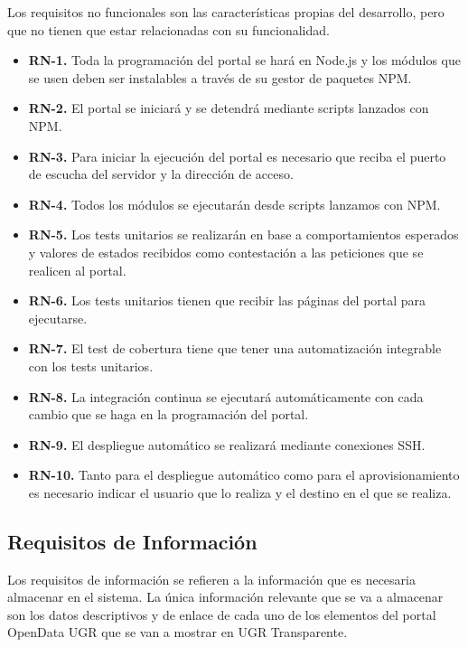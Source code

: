 Los requisitos no funcionales son las características propias del desarrollo, pero que no tienen que estar relacionadas con su 
funcionalidad.

\begin{itemize}
  \item \textbf{RN-1.} Toda la programación del portal se hará en Node.js y los módulos que se usen deben ser instalables a 
  través de su gestor de paquetes NPM.
  \item \textbf{RN-2.} El portal se iniciará y se detendrá mediante scripts lanzados con NPM.
  \item \textbf{RN-3.} Para iniciar la ejecución del portal es necesario que reciba el puerto de escucha del servidor y la 
  dirección de acceso.
  \item \textbf{RN-4.} Todos los módulos se ejecutarán desde scripts lanzamos con NPM.
  \item \textbf{RN-5.} Los tests unitarios se realizarán en base a comportamientos esperados y valores de estados
  recibidos como contestación a las peticiones que se realicen al portal.
  \item \textbf{RN-6.} Los tests unitarios tienen que recibir las páginas del portal para ejecutarse.
  \item \textbf{RN-7.} El test de cobertura tiene que tener una automatización integrable con los tests unitarios. 
  \item \textbf{RN-8.} La integración continua se ejecutará automáticamente con cada cambio que se haga en la programación
  del portal.
  \item \textbf{RN-9.} El despliegue automático se realizará mediante conexiones SSH.
  \item \textbf{RN-10.} Tanto para el despliegue automático como para el aprovisionamiento es necesario indicar el usuario que
  lo realiza y el destino en el que se realiza.
\end{itemize}

\subsection{Requisitos de Información}

Los requisitos de información se refieren a la información que es necesaria almacenar en el sistema. La única información 
relevante que se va a almacenar son los datos descriptivos y de enlace de cada uno de los elementos del portal OpenData UGR 
que se van a mostrar en UGR Transparente.

